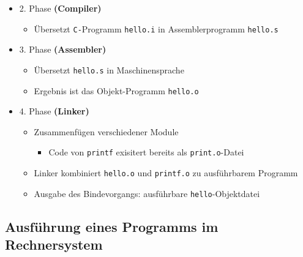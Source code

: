 \begin{itemize}
            \item 2. Phase \textbf{(Compiler)}
                \begin{itemize}
                    \item Übersetzt \texttt{C-}Programm \texttt{hello.i} in Assemblerprogramm \texttt{hello.s}
                \end{itemize}
            \item 3. Phase \textbf{(Assembler)}
                \begin{itemize}
                    \item Übersetzt \texttt{hello.s} in Maschinensprache
                    \item Ergebnis ist das Objekt-Programm \texttt{hello.o}
                \end{itemize}
            \item 4. Phase \textbf{(Linker)}
                \begin{itemize}
                    \item Zusammenfügen verschiedener Module
                        \begin{itemize}
                            \item Code von \texttt{printf} exisitert bereits als \texttt{print.o}-Datei
                        \end{itemize}
                    \item Linker kombiniert \texttt{hello.o} und \texttt{printf.o} zu ausführbarem Programm
                    \item Ausgabe des Bindevorgangs: ausführbare \texttt{hello}-Objektdatei
                \end{itemize}
        
        \end{itemize}

\pagebreak

\subsection{Ausführung eines Programms im Rechnersystem}
        
